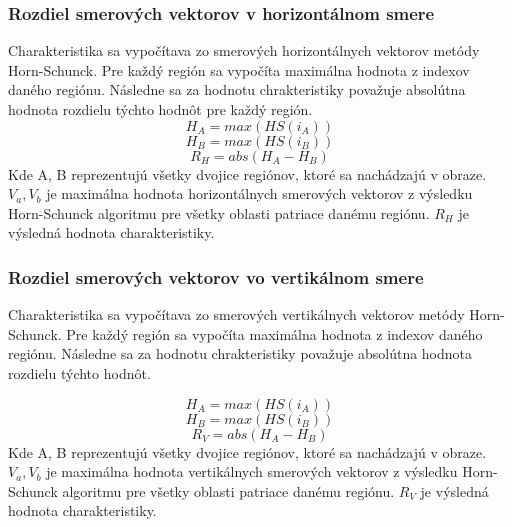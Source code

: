 \subsubsection{Rozdiel smerových vektorov v horizontálnom smere}
Charakteristika sa vypočítava zo smerových horizontálnych vektorov metódy Horn-Schunck.
Pre každý región sa vypočíta maximálna hodnota z indexov daného regiónu.
Následne sa za hodnotu chrakteristiky považuje absolútna hodnota rozdielu týchto hodnôt pre každý región.
\begin{equation}
  H_A = max(HS(i_A))
\end{equation}
\begin{equation}
  H_B = max(HS(i_B))
\end{equation}
\begin{equation}
  R_{H} = abs(H_A-H_B)
\end{equation}
Kde A, B reprezentujú všetky dvojice regiónov, ktoré sa nachádzajú v obraze.
\begin{math}V_a, V_b\end{math} je maximálna hodnota horizontálnych smerových vektorov z výsledku Horn-Schunck algoritmu pre všetky oblasti patriace danému regiónu.
\begin{math}R_{H}\end{math} je výsledná hodnota charakteristiky.

\subsubsection{Rozdiel smerových vektorov vo vertikálnom smere}
Charakteristika sa vypočítava zo smerových vertikálnych vektorov metódy Horn-Schunck.
Pre každý región sa vypočíta maximálna hodnota z indexov daného regiónu.
Následne sa za hodnotu chrakteristiky považuje absolútna hodnota rozdielu týchto hodnôt.

\begin{equation}
  H_A = max(HS(i_A))
\end{equation}
\begin{equation}
  H_B = max(HS(i_B))
\end{equation}
\begin{equation}
  R_{V} = abs(H_A-H_B)
\end{equation}
Kde A, B reprezentujú všetky dvojice regiónov, ktoré sa nachádzajú v obraze.
\begin{math}V_a, V_b\end{math} je maximálna hodnota vertikálnych smerových vektorov z výsledku Horn-Schunck algoritmu pre všetky oblasti patriace danému regiónu.
\begin{math}R_{V}\end{math} je výsledná hodnota charakteristiky.

